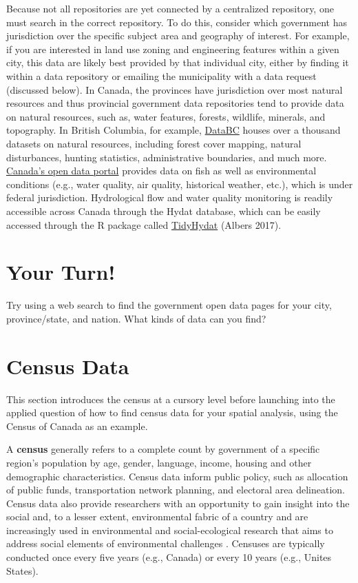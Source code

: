 \documentclass[
]{book}
\begin{document}
Because not all repositories are yet connected by a centralized repository, one must search in the correct repository. To do this, consider which government has jurisdiction over the specific subject area and geography of interest. For example, if you are interested in land use zoning and engineering features within a given city, this data are likely best provided by that individual city, either by finding it within a data repository or emailing the municipality with a data request (discussed below). In Canada, the provinces have jurisdiction over most natural resources and thus provincial government data repositories tend to provide data on natural resources, such as, water features, forests, wildlife, minerals, and topography. In British Columbia, for example, \href{https://www.data.gov.bc.ca/}{DataBC} houses over a thousand datasets on natural resources, including forest cover mapping, natural disturbances, hunting statistics, administrative boundaries, and much more. \href{https://open.canada.ca/en/open-data}{Canada's open data portal} provides data on fish as well as environmental conditions (e.g., water quality, air quality, historical weather, etc.), which is under federal jurisdiction. Hydrological flow and water quality monitoring is readily accessible across Canada through the Hydat database, which can be easily accessed through the R package called \href{https://cran.r-project.org/web/packages/tidyhydat/vignettes/tidyhydat_an_introduction.html}{TidyHydat} (Albers 2017).

\hypertarget{your-turn-2}{%
\section*{Your Turn!}\label{your-turn-2}}

Try using a web search to find the government open data pages for your city, province/state, and nation. What kinds of data can you find?

\hypertarget{census-data}{%
\section{Census Data}\label{census-data}}

This section introduces the census at a cursory level before launching into the applied question of how to find census data for your spatial analysis, using the Census of Canada as an example.

A \textbf{census} generally refers to a complete count by government of a specific region's population by age, gender, language, income, housing and other demographic characteristics. Census data inform public policy, such as allocation of public funds, transportation network planning, and electoral area delineation. Census data also provide researchers with an opportunity to gain insight into the social and, to a lesser extent, environmental fabric of a country and are increasingly used in environmental and social-ecological research that aims to address social elements of environmental challenges \citep{tomscha_guide_2016} \citep{biggs_routledge_2021}. Censuses are typically conducted once every five years (e.g., Canada) or every 10 years (e.g., Unites States).
\end{document}
